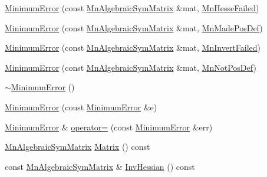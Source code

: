 \begin{DoxyCompactItemize}
\item 
\mbox{\hyperlink{classROOT_1_1Minuit2_1_1MinimumError_a8b5e1aee505048147c296087ae9b2adb}{Minimum\+Error}} (const \mbox{\hyperlink{namespaceROOT_1_1Minuit2_a9e74ad97f5537a2e80e52b04d98ecc6e}{Mn\+Algebraic\+Sym\+Matrix}} \&mat, \mbox{\hyperlink{classROOT_1_1Minuit2_1_1MinimumError_1_1MnHesseFailed}{Mn\+Hesse\+Failed}})
\item 
\mbox{\hyperlink{classROOT_1_1Minuit2_1_1MinimumError_a40d062270456e450e1895179d99ee754}{Minimum\+Error}} (const \mbox{\hyperlink{namespaceROOT_1_1Minuit2_a9e74ad97f5537a2e80e52b04d98ecc6e}{Mn\+Algebraic\+Sym\+Matrix}} \&mat, \mbox{\hyperlink{classROOT_1_1Minuit2_1_1MinimumError_1_1MnMadePosDef}{Mn\+Made\+Pos\+Def}})
\item 
\mbox{\hyperlink{classROOT_1_1Minuit2_1_1MinimumError_a91e6b02e914170669e0d10f9e8c38735}{Minimum\+Error}} (const \mbox{\hyperlink{namespaceROOT_1_1Minuit2_a9e74ad97f5537a2e80e52b04d98ecc6e}{Mn\+Algebraic\+Sym\+Matrix}} \&mat, \mbox{\hyperlink{classROOT_1_1Minuit2_1_1MinimumError_1_1MnInvertFailed}{Mn\+Invert\+Failed}})
\item 
\mbox{\hyperlink{classROOT_1_1Minuit2_1_1MinimumError_afb993aad7059efe22f48f2496e3664a9}{Minimum\+Error}} (const \mbox{\hyperlink{namespaceROOT_1_1Minuit2_a9e74ad97f5537a2e80e52b04d98ecc6e}{Mn\+Algebraic\+Sym\+Matrix}} \&mat, \mbox{\hyperlink{classROOT_1_1Minuit2_1_1MinimumError_1_1MnNotPosDef}{Mn\+Not\+Pos\+Def}})
\item 
\mbox{\hyperlink{classROOT_1_1Minuit2_1_1MinimumError_a24b67f819804d118f9e98a7a7a3e9968}{$\sim$\+Minimum\+Error}} ()
\item 
\mbox{\hyperlink{classROOT_1_1Minuit2_1_1MinimumError_a13cdd3740a255f9da59aa38a829bdc2d}{Minimum\+Error}} (const \mbox{\hyperlink{classROOT_1_1Minuit2_1_1MinimumError}{Minimum\+Error}} \&e)
\item 
\mbox{\hyperlink{classROOT_1_1Minuit2_1_1MinimumError}{Minimum\+Error}} \& \mbox{\hyperlink{classROOT_1_1Minuit2_1_1MinimumError_a991c1899c07aa31f7a61d77b648c07ad}{operator=}} (const \mbox{\hyperlink{classROOT_1_1Minuit2_1_1MinimumError}{Minimum\+Error}} \&err)
\item 
\mbox{\hyperlink{namespaceROOT_1_1Minuit2_a9e74ad97f5537a2e80e52b04d98ecc6e}{Mn\+Algebraic\+Sym\+Matrix}} \mbox{\hyperlink{classROOT_1_1Minuit2_1_1MinimumError_a7065d453e2892ed1c25b7f28d0c1aa66}{Matrix}} () const
\item 
const \mbox{\hyperlink{namespaceROOT_1_1Minuit2_a9e74ad97f5537a2e80e52b04d98ecc6e}{Mn\+Algebraic\+Sym\+Matrix}} \& \mbox{\hyperlink{classROOT_1_1Minuit2_1_1MinimumError_acfa9206a47e5fdf2d9aa1928aaf5cd04}{Inv\+Hessian}} () const

\end{DoxyCompactItemize}
